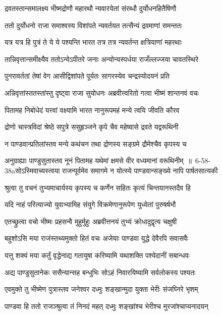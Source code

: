 \twolineshloka
{द्रवतस्तान्समालक्ष्य भीष्मद्रोणौ महारथौ}
{न्यवारयेतां संरब्धौ दुर्योधनहितैषिणौ}


\twolineshloka
{ततो दुर्योधनो राजा समाश्वस्य विशांपते}
{न्यवर्तयत तत्सैन्यं द्रवमाणां समन्ततः}


\twolineshloka
{यत्र यत्र हि पुत्रं ते ये ये पश्यन्ति भारत}
{तत्र तत्र न्यवर्तन्त क्षत्रियाणां महरथाः}


\twolineshloka
{तान्निवृत्तान्समीक्ष्यैव ततोऽन्येऽपीतरे जनाः}
{अन्योन्यस्पर्धया राजँल्लज्जया चावतस्थिरे}


\twolineshloka
{पुनरावर्ततां तेषां वेग आसीद्विशांपते}
{पूर्यतः सागरस्येव चन्द्रस्योदयनं प्रति}


\twolineshloka
{अन्निवृत्तांस्ततस्तांस्तु दृष्ट्वा राजा सुयोधनः}
{अब्रवीत्त्वरितो गत्वा भीष्मं शान्तनवं वचः}


\twolineshloka
{पितामह निबोधेदं यत्त्वां वक्ष्यामि भारत}
{नानुरूपमहं मन्ये त्वयि जीवति कौरव}


\twolineshloka
{द्रोणो चास्त्रविदां श्रेष्ठे सपुत्रे ससुहृञ्जने}
{कृपे चैव महेष्वासे द्रवते यद्वरूथिनी}


\twolineshloka
{न पाण्डवान्प्रतिलांस्तव मन्ये कथंचन}
{तथा द्रोणस्य सङ्ग्रमे द्रौमेश्चैव कृपस्य च}


\threelineshloka
{अनुग्राह्याः पाण्डुसुतास्तव नूनं पितामह}
{यथेमां क्षमसे वीर वध्यमानां वरूथिनीम् ॥ 6-58-38aसोऽस्मिवाच्यस्त्वया राजन्पूर्वमेव समागमे}
{न योत्स्ये पाण्डवान्सङ्ख्ये नापि पार्षतसात्यकी}


\twolineshloka
{श्रुत्वा तु वचनं तुभ्यमाचार्यस्य कृपस्य च}
{कर्णेन सहितः कृत्यं चिन्तयानस्तदैव हि}


\twolineshloka
{यदि नाहं परित्याज्यो युवाभ्यामिह संयुगे}
{विक्रमेणानुरूपेण युध्येतां पुरुषर्षभौ}


\twolineshloka
{एतच्छ्रुत्वा वचो भीष्मः प्रहसन्वै मुहुर्मुहुः}
{अब्रवीत्तनयं तुभ्यं क्रोधादुद्वृत्य चक्षुषी}


\twolineshloka
{बहुशोऽसि मया राजंस्तथ्यमुक्तो हितं वचः}
{अजेयाः पाण्डवा युद्धे देवैरपि सवासवैः}


\twolineshloka
{यत्तु शक्यं मया कर्तुं वृद्धेनाद्य गतायुषा}
{करिष्यामि यथाशक्ति पश्येदानीं सबान्धवः}


\twolineshloka
{अद्य पाण्डुसुतानेकः ससैन्यान्सह बन्धुभिः}
{सोऽहं निवारयिष्यामि सर्वलोकस्य पश्यतः}


\twolineshloka
{एवमुक्ते तु भीष्मेण पुत्रास्तव जनेश्वर}
{दध्मुः शङ्खान्मुदा युक्ता भेरीः संजघ्निरे भृशम्}


\twolineshloka
{पाण्डवा हि ततो राजञ्श्रुत्वा तं निनदं महत्}
{दध्मुः शङ्खांश्च भेरीश्च मुरजांश्चाप्यनादयन्}



